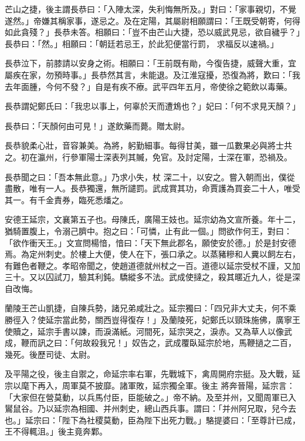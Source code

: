 \begin{pinyinscope}
 芒山之捷，後主謂長恭曰：「入陣太深，失利悔無所及。」對曰：「家事親切，不覺遂然。」帝嫌其稱家事，遂忌之。及在定陽，其屬尉相願謂曰：「王既受朝寄，何得如此貪殘？」長恭未答。相願曰：「豈不由芒山大捷，恐以威武見忌，欲自穢乎？」長恭曰：「然。」相願曰：「朝廷若忌王，於此犯便當行罰，
 求福反以速禍。」



 長恭泣下，前膝請以安身之術。相願曰：「王前既有勛，今復告捷，威聲大重，宜屬疾在家，勿預時事。」長恭然其言，未能退。及江淮寇擾，恐復為將，歎曰：「我去年面腫，今何不發？」自是有疾不療。武平四年五月，帝使徐之範飲以毒藥。



 長恭謂妃鄭氏曰：「我忠以事上，何辜於天而遭鴆也？」妃曰：「何不求見天顏？」



 長恭曰：「天顏何由可見！」遂飲藥而薨。贈太尉。



 長恭貌柔心壯，音容兼美。為將，躬勤細事。每得甘美，雖一瓜數果必與將士共之。初在瀛州，行參軍陽士深表列其贓，免官。及討定陽，士深在軍，恐禍及。



 長恭聞之曰：「吾本無此意。」乃求小失，杖
 深二十，以安之。嘗入朝而出，僕從盡散，唯有一人。長恭獨還，無所譴罰。武成賞其功，命賈護為買妾二十人，唯受其一。有千金責券，臨死悉燔之。



 安德王延宗，文襄第五子也。母陳氏，廣陽王妓也。延宗幼為文宣所養。年十二，猶騎置腹上，令溺己臍中。抱之曰：「可憐，止有此一個。」問欲作何王，對曰：「欲作衝天王。」文宣問楊愔，愔曰：「天下無此郡名，願使安於德。」於是封安德焉。為定州刺史。於樓上大便，使人在下，張口承之。以蒸豬糝和人糞以飼左右，有難色者鞭之。孝昭帝聞之，使趙道德就州杖之一百。道德以延宗受杖不謹，又加
 三十。又以囚試刀，驗其利鈍。驕縱多不法。武成使撻之，殺其暱近九人，從是深自改悔。



 蘭陵王芒山凱捷，自陳兵勢，諸兄弟咸壯之。延宗獨曰：「四兄非大丈夫，何不乘勝徑入？使延宗當此勢，關西豈得復存！」及蘭陵死，妃鄭氏以頸珠施佛，廣寧王使贖之，延宗手書以諫，而淚滿紙。河間死，延宗哭之，淚赤。又為草人以像武成，鞭而訊之曰：「何故殺我兄！」奴告之，武成覆臥延宗於地，馬鞭撾之二百，幾死。後歷司徒、太尉。



 及平陽之役，後主自禦之，命延宗率右軍，先戰城下，禽周開府宗挺。及大戰，延宗以麾下再入，周軍莫不披靡。諸軍敗，延宗獨全軍。後主
 將奔晉陽，延宗言：「大家但在營莫動，以兵馬付臣，臣能破之。」帝不納。及至并州，又聞周軍已入鸑鼠谷。乃以延宗為相國、并州刺史，總山西兵事。謂曰：「并州阿兄取，兒今去也。」延宗曰：「陛下為社稷莫動，臣為陛下出死力戰。」駱提婆曰：「至尊計已成，王不得輒沮。」後主竟奔鄴。




\end{pinyinscope}
